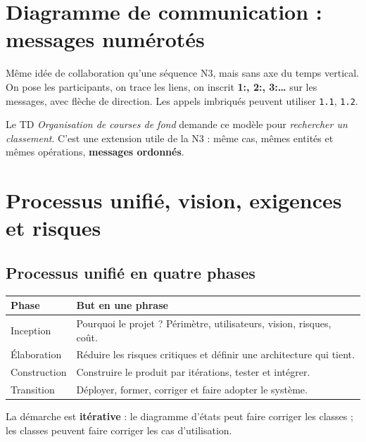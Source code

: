 \documentclass[10pt,a4paper]{article}
\begin{document}
\section{Diagramme de communication : messages numérotés}
Même idée de collaboration qu'une séquence N3, mais sans axe du temps vertical. On pose les participants, on trace les liens, on inscrit \textbf{1:, 2:, 3:\ldots} sur les messages, avec flèche de direction. Les appels imbriqués peuvent utiliser \texttt{1.1}, \texttt{1.2}.
\begin{center}
\end{center}
Le TD \emph{Organisation de courses de fond} demande ce modèle pour \emph{rechercher un classement}. C'est une extension utile de la N3 : même cas, mêmes entités et mêmes opérations, \textbf{messages ordonnés}.

\section{Processus unifié, vision, exigences et risques}
\subsection{Processus unifié en quatre phases}
\begin{tabularx}{\linewidth}{@{}p{29mm}X@{}}
\toprule
Phase & But en une phrase \\
\midrule
Inception & Pourquoi le projet ? Périmètre, utilisateurs, vision, risques, coût. \\
Élaboration & Réduire les risques critiques et définir une architecture qui tient. \\
Construction & Construire le produit par itérations, tester et intégrer. \\
Transition & Déployer, former, corriger et faire adopter le système. \\
\bottomrule
\end{tabularx}
La démarche est \textbf{itérative} : le diagramme d'états peut faire corriger les classes ; les classes peuvent faire corriger les cas d'utilisation.
\end{document}
